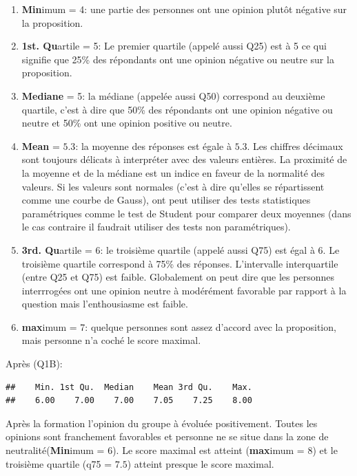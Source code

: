 \documentclass[12pt,english,french]{article}\usepackage{graphicx, color}
\makeatletter
\newenvironment{kframe}{%
 \def\at@end@of@kframe{}%
 \ifinner\ifhmode%
  \def\at@end@of@kframe{\end{minipage}}%
  \begin{minipage}{\columnwidth}%
 \fi\fi%
 \def\FrameCommand##1{\hskip\@totalleftmargin \hskip-\fboxsep
 \colorbox{shadecolor}{##1}\hskip-\fboxsep
     \hskip-\linewidth \hskip-\@totalleftmargin \hskip\columnwidth}%
 \MakeFramed {\advance\hsize-\width
   \@totalleftmargin\z@ \linewidth\hsize
   \@setminipage}}%
 {\par\unskip\endMakeFramed%
 \at@end@of@kframe}
\newenvironment{knitrout}{}{} %
\makeatother
\begin{document}
\begin{enumerate}
  \item \textbf{Min}imum = 4: une partie des personnes ont une opinion plutôt négative sur la proposition.
  \item \textbf{1st. Qu}artile = 5: Le premier quartile (appelé aussi Q25) est à 5 ce qui signifie que 25\% des répondants ont une opinion négative ou neutre sur la proposition.
  \item \textbf{Mediane} = 5: la médiane (appelée aussi Q50) correspond au deuxième quartile, c'est à dire que 50\% des répondants ont une opinion négative ou neutre et 50\% ont une opinion positive ou neutre.
  \item \textbf{Mean} = $5.3$: la moyenne des réponses est égale à $5.3$. Les chiffres décimaux sont toujours délicats à interpréter avec des valeurs entières. La proximité de la moyenne et de la médiane est un indice en faveur de la normalité des valeurs. Si les valeurs sont normales (c'est à dire qu'elles se répartissent comme une courbe de Gauss), ont peut utiliser des tests statistiques paramétriques comme le test de Student pour comparer deux moyennes (dans le cas contraire il faudrait utiliser des tests non paramétriques).
  \item \textbf{3rd. Qu}artile = 6: le troisième quartile (appelé aussi Q75) est égal à 6. Le troisième quartile correspond à 75\% des réponses. L'intervalle interquartile (entre Q25 et Q75) est faible. Globalement on peut dire que les personnes interrrogées ont une opinion neutre à modérément favorable par rapport à la question mais l'enthousiasme est faible.
  \item \textbf{max}imum = 7: quelque personnes sont assez d'accord avec la proposition, mais personne n'a coché le score maximal.
\end{enumerate}

Après (Q1B):
\begin{knitrout}
\color{fgcolor}\begin{kframe}
\begin{verbatim}
##    Min. 1st Qu.  Median    Mean 3rd Qu.    Max. 
##    6.00    7.00    7.00    7.05    7.25    8.00
\end{verbatim}
\end{kframe}
\end{knitrout}

Après la formation l'opinion du groupe à évoluée positivement. Toutes les opinions sont franchement favorables et personne ne se situe dans la zone de neutralité(\textbf{Min}imum = 6). Le score maximal est atteint (\textbf{max}imum = 8) et le troisième quartile (q75 = $7.5$) atteint presque le score maximal.
\end{document}
